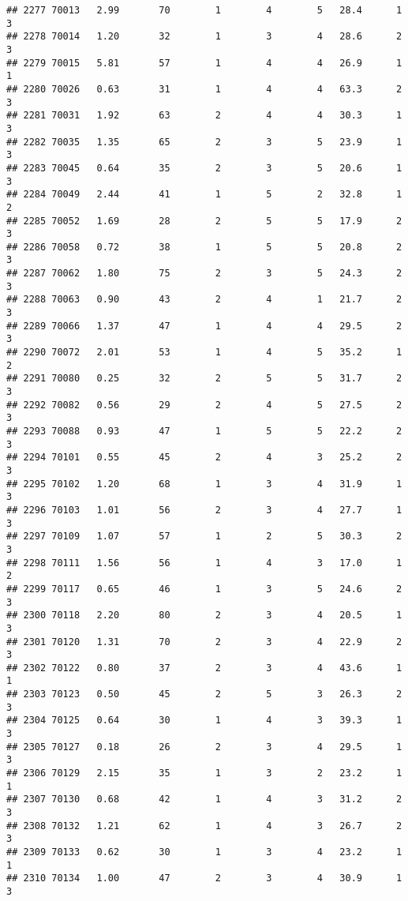 \documentclass[
]{article}
\begin{document}
\begin{verbatim}
## 2277 70013   2.99       70        1        4        5   28.4      1      3
## 2278 70014   1.20       32        1        3        4   28.6      2      3
## 2279 70015   5.81       57        1        4        4   26.9      1      1
## 2280 70026   0.63       31        1        4        4   63.3      2      3
## 2281 70031   1.92       63        2        4        4   30.3      1      3
## 2282 70035   1.35       65        2        3        5   23.9      1      3
## 2283 70045   0.64       35        2        3        5   20.6      1      3
## 2284 70049   2.44       41        1        5        2   32.8      1      2
## 2285 70052   1.69       28        2        5        5   17.9      2      3
## 2286 70058   0.72       38        1        5        5   20.8      2      3
## 2287 70062   1.80       75        2        3        5   24.3      2      3
## 2288 70063   0.90       43        2        4        1   21.7      2      3
## 2289 70066   1.37       47        1        4        4   29.5      2      3
## 2290 70072   2.01       53        1        4        5   35.2      1      2
## 2291 70080   0.25       32        2        5        5   31.7      2      3
## 2292 70082   0.56       29        2        4        5   27.5      2      3
## 2293 70088   0.93       47        1        5        5   22.2      2      3
## 2294 70101   0.55       45        2        4        3   25.2      2      3
## 2295 70102   1.20       68        1        3        4   31.9      1      3
## 2296 70103   1.01       56        2        3        4   27.7      1      3
## 2297 70109   1.07       57        1        2        5   30.3      2      3
## 2298 70111   1.56       56        1        4        3   17.0      1      2
## 2299 70117   0.65       46        1        3        5   24.6      2      3
## 2300 70118   2.20       80        2        3        4   20.5      1      3
## 2301 70120   1.31       70        2        3        4   22.9      2      3
## 2302 70122   0.80       37        2        3        4   43.6      1      1
## 2303 70123   0.50       45        2        5        3   26.3      2      3
## 2304 70125   0.64       30        1        4        3   39.3      1      3
## 2305 70127   0.18       26        2        3        4   29.5      1      3
## 2306 70129   2.15       35        1        3        2   23.2      1      1
## 2307 70130   0.68       42        1        4        3   31.2      2      3
## 2308 70132   1.21       62        1        4        3   26.7      2      3
## 2309 70133   0.62       30        1        3        4   23.2      1      1
## 2310 70134   1.00       47        2        3        4   30.9      1      3

\end{verbatim}
\end{document}
